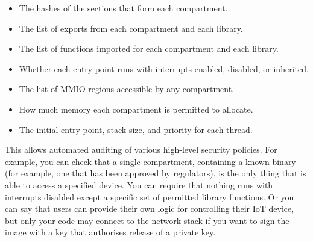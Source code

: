 \begin{itemize}
	\item{The hashes of the sections that form each compartment.}
	\item{The list of exports from each compartment and each library.}
	\item{The list of functions imported for each compartment and each library.}
	\item{Whether each entry point runs with interrupts enabled, disabled, or inherited.}
	\item{The list of MMIO regions accessible by any compartment.}
	\item{How much memory each compartment is permitted to allocate.}
	\item{The initial entry point, stack size, and priority for each thread.}
\end{itemize}

This allows automated auditing of various high-level security policies.
For example, you can check that a single compartment, containing a known binary (for example, one that has been approved by regulators), is the only thing that is able to access a specified device.
You can require that nothing runs with interrupts disabled except a specific set of permitted library functions.
Or you can say that users can provide their own logic for controlling their IoT device, but only your code may connect to the network stack if you want to sign the image with a key that authorises release of a private key.

